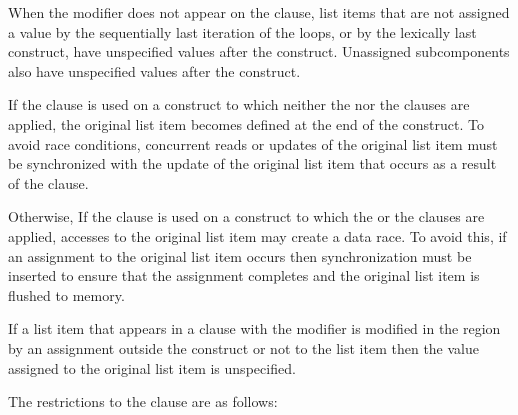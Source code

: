 When the  modifier does not appear on the  clause, list items that are not
assigned a value by the sequentially last iteration of the loops, or by the
lexically last  construct, have unspecified values after the
construct.  Unassigned subcomponents also have unspecified values after the
construct.

If the  clause is used on a construct to which neither
the  nor the  clauses are applied, the original list item
becomes defined at the end of the construct.  To avoid race conditions,
concurrent reads or updates of the original list item must be synchronized with
the update of the original list item that occurs as a result of the
 clause.

Otherwise, If the  clause is used on a construct to which
the  or the  clauses are applied, accesses to the original
list item may create a data race.  To avoid this, if an assignment to the
original list item occurs then synchronization must be inserted to ensure that
the assignment completes and the original list item is flushed to memory.

If a list item that appears in a  clause with the
 modifier is modified in the region by an assignment
outside the construct or not to the list item then the value assigned to
the original list item is unspecified.

\restrictions
The restrictions to the  clause are as follows:

